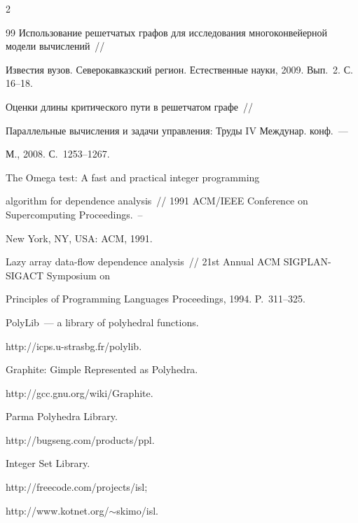 \begin{multicols}{2}
{{\begin{thebibliography}{99}
Использование решетчатых графов для исследования многоконвейерной модели вы\-чис\-ле\-ний~// 

Известия вузов. Северокавказский регион. Естественные науки, 2009. Вып.~2. С. 16--18.




 Оценки длины критического пути в решетчатом графе~// 

Параллельные вы\-чис\-ле\-ния и задачи управления: Труды IV Междунар. конф.~--- 

М., 2008. С.~1253--1267.




 The Omega test: A fast and practical integer programming 

algorithm for dependence analysis~// 1991 ACM/IEEE Conference on Supercomputing Proceedings.~-- 

New York, NY, USA: ACM, 1991.





Lazy array data-flow dependence analysis~// 21st Annual ACM SIGPLAN-SIGACT Symposium on 

Principles of Programming Languages Proceedings, 1994. P.~311--325.



 PolyLib~--- a library of polyhedral functions. 

{\sf http://icps.\linebreak u-strasbg.fr/polylib}.



 Graphite: Gimple Represented as Polyhedra.

{\sf http://gcc.\linebreak gnu.org/wiki/Graphite}.



 Parma Polyhedra Library.

{\sf http://bugseng.com/\linebreak products/ppl}.



 Integer Set Library.

{\sf http://freecode.com/projects/isl};

{\sf http://www.kotnet.org/$\sim$skimo/isl}.




\end{thebibliography}}}
\end{multicols}
